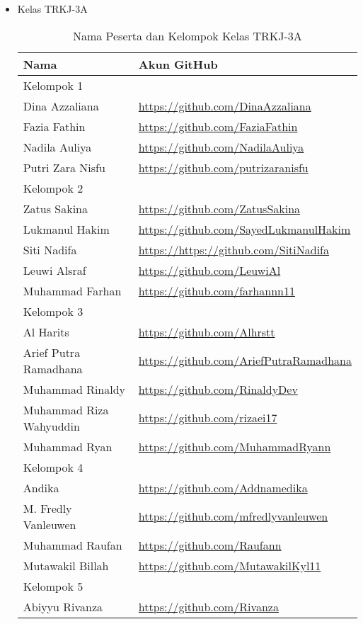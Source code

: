 \documentclass[a4paper]{tufte-handout}
\begin{document}
\begin{projects}
\begin{description}
\begin{itemize}
\item Kelas TRKJ-3A
\begin{table}[!ht]
\caption{Nama Peserta dan Kelompok Kelas TRKJ-3A}
\label{tab:peserta}
\centering
\begin{tabular}{ll} 
\toprule
Nama &	Akun GitHub\\
\midrule
Kelompok 1\\
\midrule
Dina Azzaliana			& \url{https://github.com/DinaAzzaliana} \\
Fazia Fathin			& \url{https://github.com/FaziaFathin} \\
Nadila Auliya	    	& \url{https://github.com/NadilaAuliya} \\
Putri Zara Nisfu		& \url{https://github.com/putrizaranisfu} \\
\midrule
Kelompok 2\\
\midrule
Zatus Sakina			& \url{https://github.com/ZatusSakina} \\
Lukmanul Hakim			& \url{https://github.com/SayedLukmanulHakim} \\
Siti Nadifa				& \url{https://https://github.com/SitiNadifa} \\
Leuwi Alsraf			& \url{https://github.com/LeuwiAl} \\
Muhammad Farhan			& \url{https://github.com/farhannn11} \\
\midrule
Kelompok 3\\
\midrule
Al Harits				& \url{https://github.com/Alhrstt} \\
Arief Putra Ramadhana	& \url{https://github.com/AriefPutraRamadhana} \\
Muhammad Rinaldy		& \url{https://github.com/RinaldyDev} \\
Muhammad Riza Wahyuddin	& \url{https://github.com/rizaei17} \\
Muhammad Ryan			& \url{https://github.com/MuhammadRyann} \\
\midrule
Kelompok 4\\
\midrule
Andika					& \url{https://github.com/Addnamedika} \\
M. Fredly Vanleuwen		& \url{https://github.com/mfredlyvanleuwen} \\
Muhammad Raufan			& \url{https://github.com/Raufann} \\
Mutawakil Billah		& \url{https://github.com/MutawakilKyl11} \\
\midrule
Kelompok 5\\
\midrule
Abiyyu Rivanza			& \url{https://github.com/Rivanza} \\

\end{tabular}
\end{table}
\end{itemize}
\end{description}
\end{projects}
\end{document}
